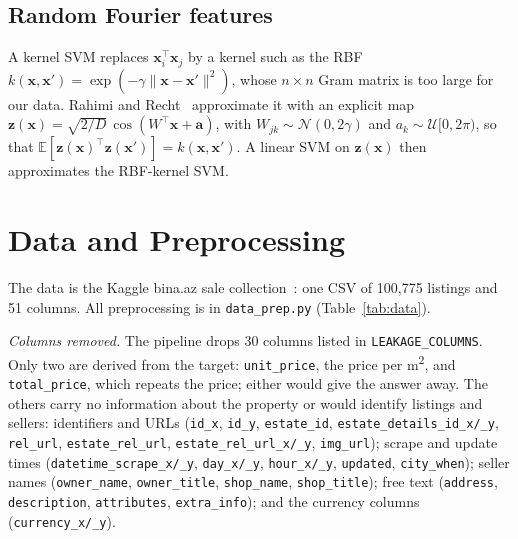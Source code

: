 \documentclass[10pt,twocolumn,a4paper]{article}
\begin{document}
\subsection{Random Fourier features}
A kernel SVM replaces $\mathbf{x}_i^\top\mathbf{x}_j$ by a kernel such as
the RBF $k(\mathbf{x},\mathbf{x}') = \exp(-\gamma\lVert\mathbf{x}-\mathbf{x}'\rVert^2)$,
whose $n \times n$ Gram matrix is too large for our data.
Rahimi and Recht~\cite{rahimi} approximate it with an explicit map
$\mathbf{z}(\mathbf{x}) = \sqrt{2/D}\,\cos(W^\top\mathbf{x} + \mathbf{a})$,
with $W_{jk} \sim \mathcal{N}(0, 2\gamma)$ and
$a_k \sim \mathcal{U}[0, 2\pi)$, so that
$\mathbb{E}[\mathbf{z}(\mathbf{x})^\top\mathbf{z}(\mathbf{x}')] = k(\mathbf{x},\mathbf{x}')$.
A linear SVM on $\mathbf{z}(\mathbf{x})$ then approximates the RBF-kernel SVM.

\section{Data and Preprocessing}
\label{sec:data}
The data is the Kaggle bina.az sale collection~\cite{kaggle}: one CSV of
100{,}775 listings %
and 51 columns. %
All preprocessing is in \texttt{data\_prep.py} (Table~\ref{tab:data}).

{\raggedright\textit{Columns removed.} The pipeline drops 30 columns %
listed in \texttt{LEAKAGE\_COLUMNS}. %
Only two are derived from the target: \texttt{unit\_price}, the price per
m\textsuperscript{2}, and \texttt{total\_price}, which repeats the price;
either would give the answer away. The others carry no information about
the property or would identify listings and sellers: identifiers and URLs
(\texttt{id\_x}, \texttt{id\_y}, \texttt{estate\_id},
\texttt{estate\_details\_id\_x/\_y}, \texttt{rel\_url},
\texttt{estate\_rel\_url}, \texttt{estate\_rel\_url\_x/\_y},
\texttt{img\_url}); scrape and update times (\texttt{datetime\_scrape\_x/\_y},
\texttt{day\_x/\_y}, \texttt{hour\_x/\_y}, \texttt{updated},
\texttt{city\_when}); seller names (\texttt{owner\_name},
\texttt{owner\_title}, \texttt{shop\_name}, \texttt{shop\_title}); free
text (\texttt{address}, \texttt{description}, \texttt{attributes},
\texttt{extra\_info}); and the currency columns
(\texttt{currency\_x/\_y}).\par}
\end{document}
